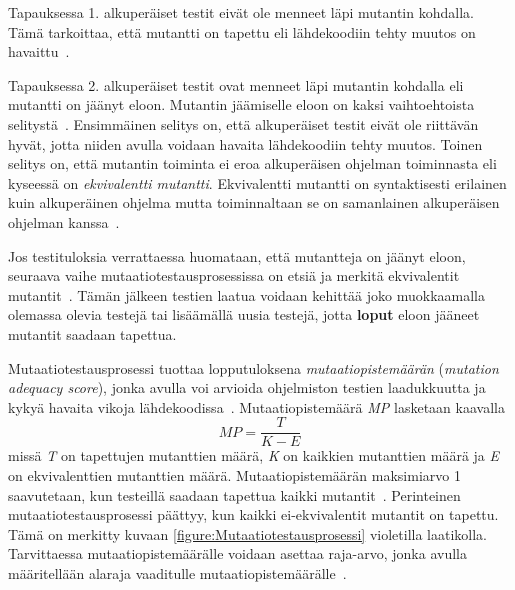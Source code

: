 \documentclass[finnish, grading]{tktltiki2}
\theoremstyle{definition}
\theoremstyle{remark}
\begin{document}
Tapauksessa 1. alkuperäiset testit eivät ole menneet läpi mutantin kohdalla. Tämä tarkoittaa, että mutantti on tapettu eli lähdekoodiin tehty muutos on havaittu~\cite[s. 36]{DeMillo:Lipton:Sayward:1978}.

Tapauksessa 2. alkuperäiset testit ovat menneet läpi mutantin kohdalla eli mutantti on jäänyt eloon. Mutantin jäämiselle eloon on kaksi vaihtoehtoista selitystä~\cite[s. 36]{DeMillo:Lipton:Sayward:1978}. Ensimmäinen selitys on, että alkuperäiset testit eivät ole riittävän hyvät, jotta niiden avulla voidaan havaita lähdekoodiin tehty muutos. Toinen selitys on, että mutantin toiminta ei eroa alkuperäisen ohjelman toiminnasta eli kyseessä on \textit{ekvivalentti mutantti}. Ekvivalentti mutantti on syntaktisesti erilainen kuin alkuperäinen ohjelma mutta toiminnaltaan se on samanlainen alkuperäisen ohjelman kanssa~\cite[s. 652]{Jia:Harman:2011}.

Jos testituloksia verrattaessa huomataan, että mutantteja on jäänyt eloon, seuraava vaihe mutaatiotestausprosessissa on etsiä ja merkitä ekvivalentit mutantit~\cite[s. 36]{Offutt:Untch:2001}. Tämän jälkeen testien laatua voidaan kehittää joko muokkaamalla olemassa olevia testejä tai lisäämällä uusia testejä, jotta \textbf{loput} eloon jääneet mutantit saadaan tapettua.

Mutaatiotestausprosessi tuottaa lopputuloksena \textit{mutaatiopistemäärän} (\textit{mutation adequacy score}), jonka avulla voi arvioida ohjelmiston testien laadukkuutta ja kykyä havaita vikoja lähdekoodissa~\cite[s. 652]{Jia:Harman:2011}. Mutaatiopistemäärä \textit{MP} lasketaan kaavalla 
\begin{equation}
MP = \frac{T}{K - E}
\end{equation}
missä \textit{T} on tapettujen mutanttien määrä, \textit{K} on kaikkien mutanttien määrä ja \textit{E} on ekvivalenttien mutanttien määrä. Mutaatiopistemäärän maksimiarvo 1 saavutetaan, kun testeillä saadaan tapettua kaikki mutantit~\cite[s. 36]{Offutt:Untch:2001}. Perinteinen mutaatiotestausprosessi päättyy, kun kaikki ei-ekvivalentit mutantit on tapettu. Tämä on merkitty kuvaan \ref{figure:Mutaatiotestausprosessi} violetilla laatikolla. Tarvittaessa mutaatiopistemäärälle voidaan asettaa raja-arvo, jonka avulla määritellään alaraja vaaditulle mutaatiopistemäärälle~\cite[s. 36]{Offutt:Untch:2001}.
\end{document}

